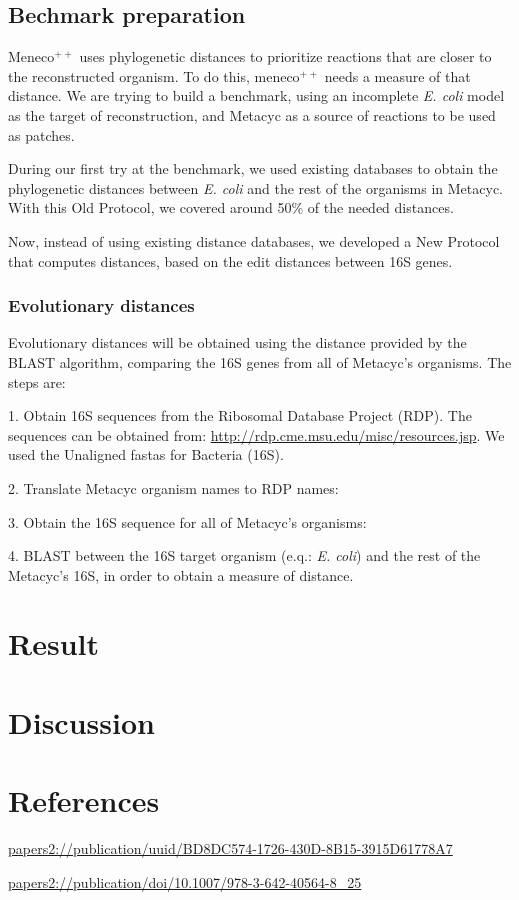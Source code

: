 \documentclass{article}
\newcommand{\Meneco}{Meneco$^{++}$\xspace}
\newcommand{\meneco}{meneco$^{++}$\xspace}
\begin{document}
\subsection{Bechmark preparation}

\Meneco uses phylogenetic distances to prioritize reactions that are closer to the reconstructed organism. To do this, \meneco needs a measure of that distance. We are trying to build a benchmark, using an incomplete \emph{E. coli} model as the target of reconstruction, and Metacyc as a source of reactions to be used as patches.

During our first try at the benchmark, we used existing databases to obtain the phylogenetic distances between \emph{E. coli} and the rest of the organisms in Metacyc. With this Old Protocol, we covered around 50\% of the needed distances.

Now, instead of using existing distance databases, we developed a New Protocol that computes distances, based on the edit distances between 16S genes.


\subsubsection{Evolutionary distances}

Evolutionary distances will be obtained using the distance provided by the BLAST algorithm, comparing the 16S genes from all of Metacyc's organisms. The steps are:

1. Obtain 16S sequences from the Ribosomal Database Project (RDP). The sequences can be obtained from: \url{http://rdp.cme.msu.edu/misc/resources.jsp}. We used the Unaligned fastas for Bacteria (16S).

2. Translate Metacyc organism names to RDP names:

3. Obtain the 16S sequence for all of Metacyc's organisms:

4. BLAST between the 16S target organism (e.q.: \emph{E. coli}) and the rest of the Metacyc's 16S, in order to obtain a measure of distance.



\section{Result}


\section{Discussion}

\section{References}


\url{papers2://publication/uuid/BD8DC574-1726-430D-8B15-3915D61778A7}

\url{papers2://publication/doi/10.1007/978-3-642-40564-8_25}
\end{document}
